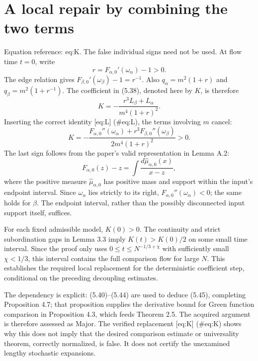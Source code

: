 \documentclass[10pt]{article}
\begin{document}
\section*{A local repair by combining the two terms}
Equation reference: eq:K. The false individual signs need not be used. At flow time \(t=0\), write \[r=F_{\alpha,0}'(\omega_\alpha)-1>0.\] The edge relation gives \(F_{\beta,0}'(\omega_\beta)-1=r^{-1}\). Also \(q_\alpha=m^2(1+r)\) and \(q_\beta=m^2(1+r^{-1})\). The coefficient in (5.38), denoted here by \(K\), is therefore \[K=-\frac{r^3L_\beta+L_\alpha}{m^4(1+r)^2}.\] Inserting the correct identity [eq:L] (\#eq:L), the terms involving \(m\) cancel: \[
 K=-\frac{F_{\alpha,0}''(\omega_\alpha)
                 +r^3F_{\beta,0}''(\omega_\beta)}
               {2m^4(1+r)^2}>0 .\] The last sign follows from the paper’s valid representation in Lemma A.2: \[F_{\alpha,0}(z)-z
       =\int\frac{d\widehat\mu_{\alpha,0}(x)}{x-z},\] where the positive measure \(\widehat\mu_{\alpha,0}\) has positive mass and support within the input’s endpoint interval. Since \(\omega_\alpha\) lies strictly to its right, \(F_{\alpha,0}''(\omega_\alpha)<0\); the same holds for \(\beta\). The endpoint interval, rather than the possibly disconnected input support itself, suffices.\par
For each fixed admissible model, \(K(0)>0\). The continuity and strict subordination gaps in Lemma 3.3 imply \(K(t)>K(0)/2\) on some small time interval. Since the proof only uses \(0\le t\le N^{-1/3+\chi}\) with sufficiently small \(\chi<1/3\), this interval contains the full comparison flow for large \(N\). This establishes the required local replacement for the deterministic coefficient step, conditional on the preceding decoupling estimates.\par
The dependency is explicit: (5.40)–(5.44) are used to deduce (5.45), completing Proposition 4.7; that proposition supplies the derivative bound for Green function comparison in Proposition 4.3, which feeds Theorem 2.5. The acquired argument is therefore assessed as Major. The verified replacement [eq:K] (\#eq:K) shows why this does not imply that the desired comparison estimate or universality theorem, correctly normalized, is false. It does not certify the unexamined lengthy stochastic expansions.\par
\end{document}
